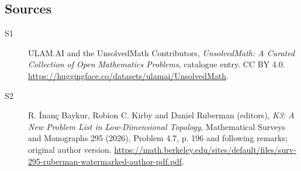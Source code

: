 \documentclass[11pt]{article}
\begin{document}
\subsection{Sources}
\begin{description}
\item[\hypertarget{source:statement:1}{S1}] ULAM.AI and the UnsolvedMath Contributors, \emph{UnsolvedMath: A Curated Collection of Open Mathematics Problems}, catalogue entry. CC BY 4.0. \url{https://huggingface.co/datasets/ulamai/UnsolvedMath}.
\item[\hypertarget{source:statement:2}{S2}] R. İnanç Baykur, Robion C. Kirby and Daniel Ruberman (editors), \emph{K3: A New Problem List in Low-Dimensional Topology}, Mathematical Surveys and Monographs 295 (2026), Problem 4.7, p. 196 and following remarks; original author version. \url{https://math.berkeley.edu/sites/default/files/surv-295-ruberman-watermarked-author-pdf.pdf}.
\end{description}
\label{end:statement}
\end{document}
